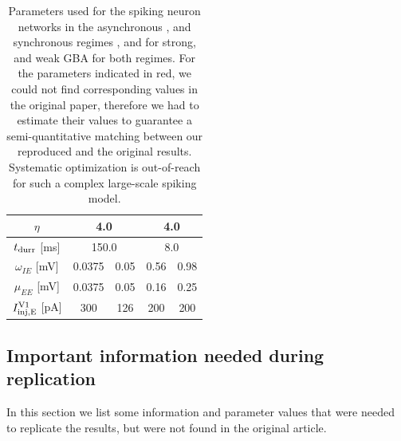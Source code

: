 \begin{table}[!ht]
\begin{tabular}{c|c|c|c|c|}
\multicolumn{1}{|c|}{$\eta$}                             & \multicolumn{2}{c|}{4.0}                   & \multicolumn{2}{c|}{4.0}                  \\ \hline
\multicolumn{1}{|c|}{$t_{\rm durr} $ {[}ms{]}}           & \multicolumn{2}{c|}{150.0}                 & \multicolumn{2}{c|}{8.0}                  \\ \hline
\multicolumn{1}{|c|}{$\omega_{IE}$ {[}mV{]}}             & 0.0375              & 0.05                 & 0.56               & 0.98                 \\ \hline
\multicolumn{1}{|c|}{$\mu_{EE}$ {[}mV{]}}                & 0.0375              & 0.05                 & 0.16               & 0.25                 \\ \hline
\multicolumn{1}{|c|}{$I_{\rm inj, E}^{\rm V1}$ {[}pA{]}} & 300                 & 126                  & 200                & 200                  \\ \hline
\end{tabular}
\caption{Parameters used for the spiking neuron networks in the asynchronous , and synchronous regimes , and for strong, and weak GBA for both regimes. For the parameters indicated in red, we could not find corresponding values in the original paper, therefore we had to estimate their values to guarantee a semi-quantitative matching between our reproduced and the original results. Systematic optimization is out-of-reach for such a complex large-scale spiking model.}\label{tab:par_spike}
\end{table}

\subsection{Important information needed during replication}
\label{important_info}

In this section we list some information and parameter values that were needed to replicate the results, but were not found in the original article.

